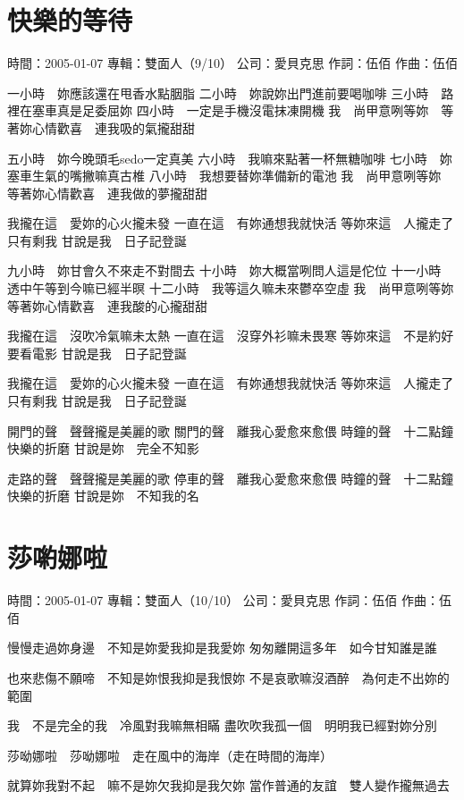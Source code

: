 \documentclass[UTF8,a4paper,oneside,twocolumn,12pt]{ctexbook}
\newcommand{\infopair}[2]{\textbullet #1：#2}
\newcommand{\zc}[1][伍佰]{\infopair{作詞}{#1}}
\newcommand{\zq}[1][伍佰]{\infopair{作曲}{#1}}
\newcommand{\zj}[1]{\infopair{專輯}{#1}}
\newcommand{\sj}[1]{\infopair{時間}{#1}}
\newcommand{\gs}[1]{\infopair{公司}{#1}}
\newenvironment{info}{\begin{flushleft}\kaishu
	}
	{\end{flushleft}\normalsize\yahei\par}
\newenvironment{lyric}{
	}
{}
\begin{document}
\section{快樂的等待}
\begin{info}
	\sj{2005-01-07}
	\zj{雙面人（9/10）}
	\gs{愛貝克思}
	\zc
	\zq
\end{info}
\begin{lyric}
	一小時　妳應該還在甩香水點胭脂
	二小時　妳說妳出門進前要喝咖啡
	三小時　路裡在塞車真是足委屈妳
	四小時　一定是手機沒電抹凍開機
	我　尚甲意咧等妳　等著妳心情歡喜　連我吸的氣攏甜甜

	五小時　妳今晚頭毛sedo一定真美
	六小時　我嘛來點著一杯無糖咖啡
	七小時　妳塞車生氣的嘴撇嘛真古椎
	八小時　我想要替妳準備新的電池
	我　尚甲意咧等妳　等著妳心情歡喜　連我做的夢攏甜甜

	我攏在這　愛妳的心火攏未發
	一直在這　有妳通想我就快活
	等妳來這　人攏走了只有剩我
	甘說是我　日子記登誕

	九小時　妳甘會久不來走不對間去
	十小時　妳大概當咧問人這是佗位
	十一小時　透中午等到今嘛已經半暝
	十二小時　我等這久嘛未來鬱卒空虛
	我　尚甲意咧等妳　等著妳心情歡喜　連我酸的心攏甜甜

	我攏在這　沒吹冷氣嘛未太熱
	一直在這　沒穿外衫嘛未畏寒
	等妳來這　不是約好要看電影
	甘說是我　日子記登誕

	我攏在這　愛妳的心火攏未發
	一直在這　有妳通想我就快活
	等妳來這　人攏走了只有剩我
	甘說是我　日子記登誕

	開門的聲　聲聲攏是美麗的歌
	關門的聲　離我心愛愈來愈偎
	時鐘的聲　十二點鐘快樂的折磨
	甘說是妳　完全不知影

	走路的聲　聲聲攏是美麗的歌
	停車的聲　離我心愛愈來愈偎
	時鐘的聲　十二點鐘快樂的折磨
	甘說是妳　不知我的名
\end{lyric}

\section{莎喲娜啦}
\begin{info}
	\sj{2005-01-07}
	\zj{雙面人（10/10）}
	\gs{愛貝克思}
	\zc
	\zq
\end{info}
\begin{lyric}
	慢慢走過妳身邊　不知是妳愛我抑是我愛妳
	匆匆離開這多年　如今甘知誰是誰

	也來悲傷不願啼　不知是妳恨我抑是我恨妳
	不是哀歌嘛沒酒醉　為何走不出妳的範圍

	我　不是完全的我　冷風對我嘛無相瞞
	盡吹吹我孤一個　明明我已經對妳分別

	莎呦娜啦　莎呦娜啦　走在風中的海岸（走在時間的海岸）

	就算妳我對不起　嘛不是妳欠我抑是我欠妳
	當作普通的友誼　雙人變作攏無過去
\end{lyric}
\end{document}

